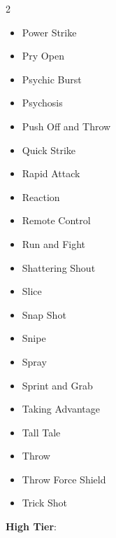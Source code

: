 \begin{multicols}{2}
\begin{itemize}
\item Power Strike
\item Pry Open
\item Psychic Burst
\item Psychosis
\item Push Off and Throw
\item Quick Strike
\item Rapid Attack
\item Reaction
\item Remote Control
\item Run and Fight
\item Shattering Shout
\item Slice
\item Snap Shot
\item Snipe
\item Spray
\item Sprint and Grab
\item Taking Advantage
\item Tall Tale
\item Throw
\item Throw Force Shield
\item Trick Shot
\end{itemize}

\textbf{High Tier}:


\end{multicols}
